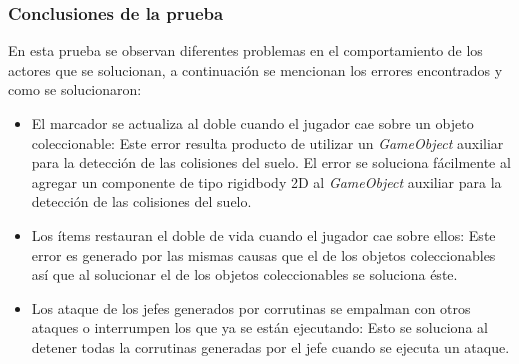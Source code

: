 \subsubsection{Conclusiones de la prueba}
En esta prueba se observan diferentes problemas en el comportamiento de los actores
que se solucionan, a continuación se mencionan los errores encontrados y como se
solucionaron:
        \begin{itemize}
                \item El marcador se actualiza al doble cuando el jugador cae
                sobre un objeto coleccionable: Este error resulta producto de
                utilizar un \textit{GameObject} auxiliar para la detección de las
                colisiones del suelo. El error se soluciona fácilmente al agregar
                un componente de tipo rigidbody 2D al \textit{GameObject} auxiliar
                para la detección de las colisiones del suelo.
                \item Los ítems restauran el doble de vida cuando el jugador cae
                sobre ellos: Este error es generado por las mismas causas que el
                de los objetos coleccionables así que al solucionar el de los
                objetos coleccionables se soluciona éste.
                \item Los ataque de los jefes generados por corrutinas se
                empalman con otros ataques o interrumpen los que ya se están
                ejecutando: Esto se soluciona al detener todas la corrutinas generadas
                por el jefe cuando se ejecuta un ataque.
        \end{itemize}